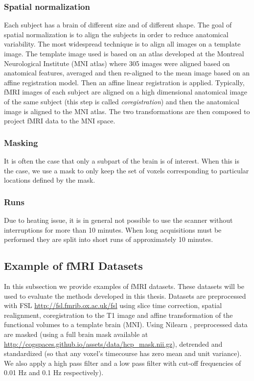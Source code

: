 \subsubsection{Spatial normalization}
Each subject has a brain of different size and of different shape.
The goal of spatial normalization is to align the subjects in order to reduce anatomical variability.
The most widespread technique is to align all images on a template image. The
template image used is based on an atlas developed at the Montreal Neurological
Institute (MNI atlas) where 305 images were aligned based on anatomical features, averaged and then re-aligned to the mean image based on an affine registration model.
Then an affine linear registration is applied. Typically, fMRI images of each subject are aligned on a high dimensional anatomical image of the same subject (this step is called \emph{coregistration}) and then the anatomical image is aligned to the MNI atlas. The two transformations are then composed to project fMRI data to the MNI space.

\subsubsection{Masking}
It is often the case that only a subpart of the brain is of interest. When this is the case, we use a mask to only keep the set of voxels corresponding to particular locations defined by the mask.

\subsubsection{Runs}
Due to heating issue, it is in general not possible to use the scanner without interruptions for more than 10 minutes.  When long acquisitions must be
performed they are split into short runs of approximately 10 minutes.


\subsection{Example of fMRI Datasets}
\label{srm:datasets:fmri}
In this subsection we provide examples of fMRI datasets. These datasets will be used to evaluate the methods developed in this thesis.
Datasets are preprocessed with FSL \url{http://fsl.fmrib.ox.ac.uk/fsl} using slice time correction, spatial realignment, coregistration to the T1 image and affine transformation of the functional volumes to a template brain (MNI).
Using Nilearn \cite{abraham2014machine}, preprocessed data are masked (using a full brain mask available at
\url{http://cogspaces.github.io/assets/data/hcp_mask.nii.gz}), detrended and
standardized (so that any voxel's timecourse has zero mean and unit variance).
We also apply a high pass filter and a low pass filter with cut-off frequencies of 0.01 Hz and 0.1 Hz respectively).

